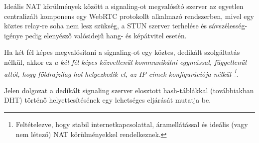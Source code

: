Ideális NAT körülmények között a signaling-ot megvalósító szerver az egyetlen centralizált komponens egy WebRTC protokollt
alkalmazó rendszerben, mivel egy köztes relay-re soha nem lesz szükség, a STUN szerver terhelése és sávszélesség-igénye
pedig elenyésző valósidejű hang- és képátvitel esetén.

Ha két fél képes megvalósítani a signaling-ot egy köztes, dedikált szolgáltatás nélkül, akkor ez \emph{a két fél képes közvetlenül
kommunikálni egymással, függetlenül attól, hogy földrajzilag hol helyezkedik el, az IP címek konfigurációja nélkül
\footnote{Feltételezve, hogy stabil internetkapcsolattal, áramellátással és ideális (vagy nem létező) NAT körülményekkel rendelkeznek.}}.

Jelen dolgozat a dedikált signaling szerver elosztott hash-táblákkal (továbbiakban DHT) történő helyettesítésének egy
lehetséges eljárását mutatja be.
